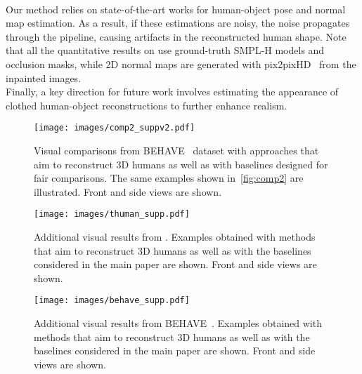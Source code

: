 \\Our method relies on state-of-the-art works for human-object pose and normal map estimation. As a result, if these estimations are noisy, the noise propagates through the pipeline, causing artifacts in the reconstructed human shape.
Note that all the quantitative results on \dataname use ground-truth SMPL-H models and occlusion masks, while 2D normal maps are generated with pix2pixHD~\cite{wang2018high}  from the inpainted images.
\\Finally, a key direction for future work involves estimating the appearance of clothed human-object reconstructions to further enhance realism.
\begin{figure*}[t]
  \centering
\texttt{[image: images/comp2\_suppv2.pdf]}
\vspace{-6mm}
\caption{Visual comparisons from BEHAVE~\cite{bhatnagar2022behave} dataset with approaches that aim to reconstruct 3D humans as well as with baselines designed for fair comparisons. The same examples shown in~\cref{fig:comp2} are illustrated. Front and side views are shown.}
\label{fig:comp2_supp}
\end{figure*}
\begin{figure*}[t]
  \centering
\texttt{[image: images/thuman\_supp.pdf]}
\vspace{-6mm}
\caption{Additional visual results from \dataname. Examples obtained with methods that aim to reconstruct 3D humans as well as with the baselines considered in the main paper are shown. Front and side views are shown.}
\label{fig:thuman_supp}
\end{figure*}

\begin{figure*}[t]
  \centering
\texttt{[image: images/behave\_supp.pdf]}
\vspace{-6mm}
\caption{Additional visual results from BEHAVE~\cite{bhatnagar2022behave}. Examples obtained with methods that aim to reconstruct 3D humans as well as with the baselines considered in the main paper are shown. Front and side views are shown.}
\label{fig:behave_supp}
\end{figure*}
